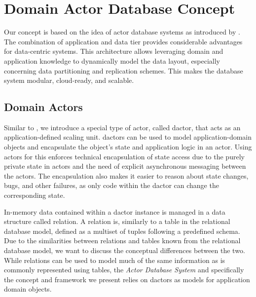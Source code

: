 
\section{Domain Actor Database Concept}\label{sec:concept}
  Our concept is based on the idea of actor database systems as introduced by \citet{manifesto}.
  The combination of application and data tier provides considerable advantages for data-centric systems.
  This architecture allows leveraging domain and application knowledge to dynamically model the data layout, especially concerning data partitioning and replication schemes.
  This makes the database system modular, cloud-ready, and scalable.

  \subsection{Domain Actors}\label{sec:dactors}
    Similar to \citet{Shah:reactdb}, we introduce a special type of actor, called \gls{dactor}, that acts as an application-defined scaling unit.
    \Glspl{dactor} can be used to model application-domain objects and encapsulate the object's state and application logic in an actor.
    Using actors for this enforces technical encapsulation of state access due to the purely private state in actors and the need of explicit asynchronous messaging between the actors.
    The encapsulation also makes it easier to reason about state changes, bugs, and other failures, as only code within the \gls{dactor} can change the corresponding state.

    In-memory data contained within a \gls{dactor} instance is managed in a data structure called \gls{relation}.
    A \gls{relation} is, similarly to a table in the relational database model, defined as a multiset of tuples following a predefined schema.
    Due to the similarities between \glspl{relation} and tables known from the relational database model, we want to discuss the conceptual differences between the two.
    While \glspl{relation} can be used to model much of the same information as is commonly represented using tables, the \textit{Actor Database System} and specifically the concept and framework we present relies on \glspl{dactor} as models for application domain objects.

